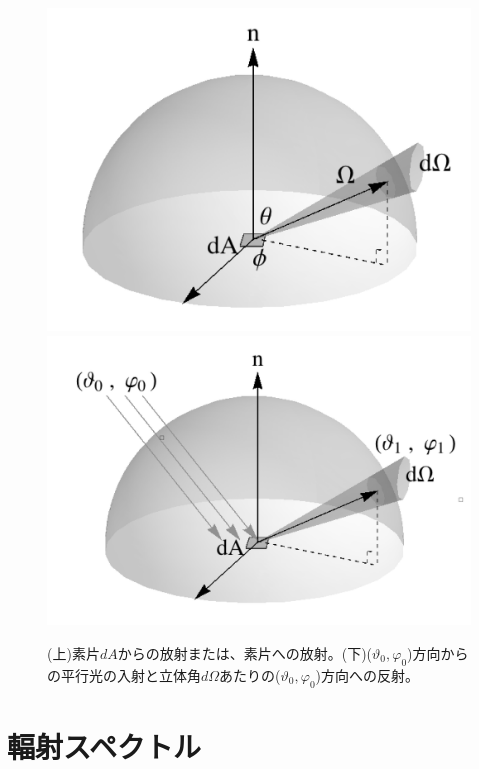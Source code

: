 \begin{figure}[]
 \begin{center}
	\includegraphics[width=\linewidth]{fig/radiance_bw.png}
	\includegraphics[width=\linewidth]{fig/brdfdef_bw.png}
\end{center}
	\caption{(上)素片$d A$からの放射または、素片への放射。(下)($\vartheta_0,\varphi_0$)方向からの平行光の入射と立体角$d \Omega$あたりの($\vartheta_0,\varphi_0$)方向への反射。}
	\label{fig:int}
\end{figure} 

\section{輻射スペクトル}

